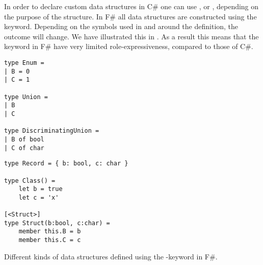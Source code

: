 In order to declare custom data structures in C\# one can use ,  or , depending on the purpose of the structure. In F\# all data structures are constructed using the  keyword. Depending on the symbols used in and around the definition, the outcome will change. We have illustrated this in . As a result this means that the  keyword in F\# have very limited role-expressiveness, compared to those of C\#.

\begin{listing}[H]
    \begin{minipage}{.45\textwidth}
        \begin{verbatim}
type Enum =
| B = 0
| C = 1

type Union =
| B
| C

type DiscriminatingUnion =
| B of bool
| C of char
        \end{verbatim}
    \end{minipage}
    \hfill
    \begin{minipage}{.45\textwidth}
        \begin{verbatim}
type Record = { b: bool, c: char }

type Class() =
    let b = true
    let c = 'x'

[<Struct>]
type Struct(b:bool, c:char) =
    member this.B = b
    member this.C = c
        \end{verbatim}
    \end{minipage}
\caption{Different kinds of data structures defined using the -keyword in F\#.}
\label{lst:fsharp:type}
\end{listing}
